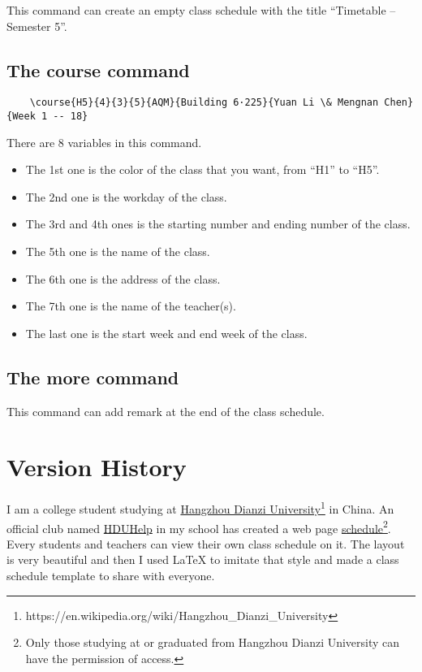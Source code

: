 \documentclass[11pt]{article}
\def\cmd#1{\texorpdfstring{\textcolor{cmdcolor}{\textsf{#1}}}{“#1”}}
\begin{document}
This command can create an empty class schedule with the title ``Timetable -- Semester 5''.
\subsection{The \cmd{course} command}

\begin{verbatim}
    \course{H5}{4}{3}{5}{AQM}{Building 6·225}{Yuan Li \& Mengnan Chen}{Week 1 -- 18}
\end{verbatim}

There are 8 variables in this command.
\begin{itemize}
  \item The 1st one is the color of the class that you want, from ``H1'' to ``H5''.
  \item The 2nd one is the workday of the class.
  \item The 3rd and 4th ones is the starting number and ending number of the class.
  \item The 5th one is the name of the class.
  \item The 6th one is the address of the class.
  \item The 7th one is the name of the teacher(s).
  \item The last one is the start week and end week of the class.
\end{itemize}
\subsection{The \cmd{more} command}
This command can add remark at the end of the class schedule.
\newpage
\section{Version History}

I am a college student studying at \href{https://www.hdu.edu.cn}{Hangzhou Dianzi University}\footnote{https://en.wikipedia.org/wiki/Hangzhou\_Dianzi\_University} in China. An official club named \href{https://www.hduhelp.cn/}{HDUHelp} in my school has created a web page \href{https://cinnamon.hduhelp.com/navigation/schedule}{schedule}\footnote{Only those studying at or graduated from Hangzhou Dianzi University can have the permission of access.}. Every students and teachers can view their own class schedule on it. The layout is very beautiful and then I used LaTeX to imitate that style and made a class schedule template to share with everyone.
\end{document}
